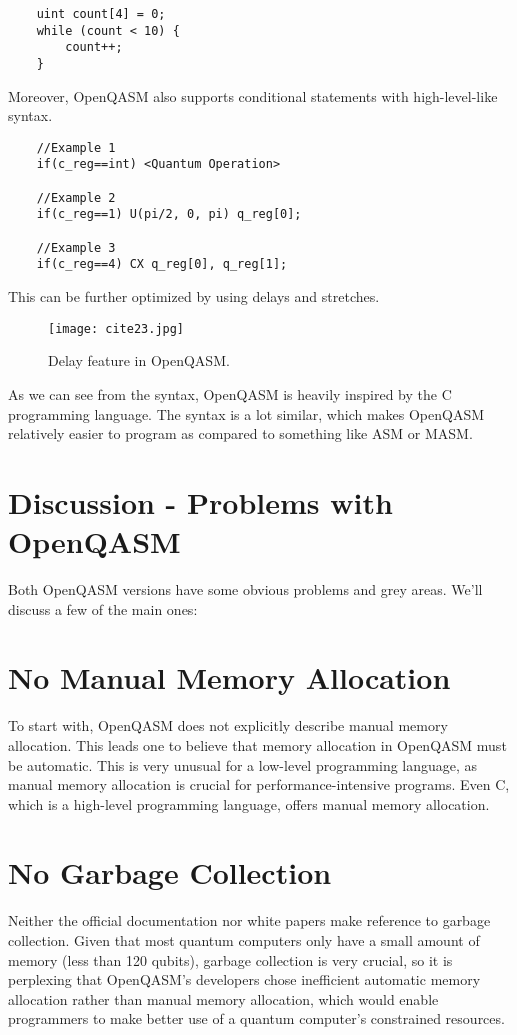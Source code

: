 \documentclass[conference]{IEEEtran}
\begin{document}
\begin{lstlisting}
    uint count[4] = 0; 
    while (count < 10) {
        count++; 
    }
\end{lstlisting}

Moreover, OpenQASM also supports conditional statements with high-level-like syntax.

\begin{lstlisting}
    //Example 1
    if(c_reg==int) <Quantum Operation>
    
    //Example 2
    if(c_reg==1) U(pi/2, 0, pi) q_reg[0];
    
    //Example 3
    if(c_reg==4) CX q_reg[0], q_reg[1];
\end{lstlisting}   

This can be further optimized by using delays and stretches. 

\begin{figure}[H]
\centering
\centerline{\texttt{[image: cite23.jpg]}}
\caption{Delay feature in OpenQASM.\cite{b3}}\label{}
\end{figure}

As we can see from the syntax, OpenQASM is heavily inspired by the C programming language. The syntax is a lot similar, which makes OpenQASM relatively easier to program as compared to something like ASM or MASM.

\section{\textbf{Discussion - Problems with OpenQASM}}
Both OpenQASM versions have some obvious problems and grey areas. We'll discuss a few of the main ones:

\section*{\textbf{No Manual Memory Allocation}}
To start with, OpenQASM does not explicitly describe manual memory allocation. This leads one to believe that memory allocation in OpenQASM must be automatic. This is very unusual for a low-level programming language, as manual memory allocation is crucial for performance-intensive programs. Even C, which is a high-level programming language, offers manual memory allocation.\cite{b3}

\section*{\textbf{No Garbage Collection}}
Neither the official documentation nor white papers make reference to garbage collection. Given that most quantum computers only have a small amount of memory (less than 120 qubits), garbage collection is very crucial, so it is perplexing that OpenQASM's developers chose inefficient automatic memory allocation rather than manual memory allocation, which would enable programmers to make better use of a quantum computer's constrained resources.
\end{document}

